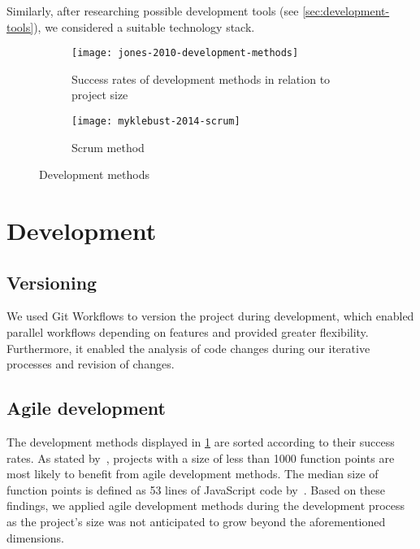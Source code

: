 Similarly, after researching possible development tools (see \cref{sec:development-tools}), we considered a suitable technology stack.

\begin{figure}[H]
    \begin{subfigure}[b]{\textwidth}
        \centering
        \texttt{[image: jones-2010-development-methods]}
        \caption[Success rates of development methods]{Success rates of development methods in relation to project size~\autocite[11]{jones_software_2010}}
        \label{fig:success-rates-development-methods}
    \end{subfigure}
    \begin{subfigure}[b]{\textwidth}
        \centering
        \texttt{[image: myklebust-2014-scrum]}
        \caption[Scrum method]{Scrum method~\autocite[2]{myklebust_scrum_nodate}}
        \label{fig:scrum-method}
    \end{subfigure}
    \caption{Development methods}\label{fig:development-methods}
\end{figure}

\section{Development}\label{sec:development}

\subsection{Versioning}\label{subsec:versioning}

We used Git Workflows to version the project during development, which enabled parallel workflows depending on features and provided greater flexibility.
Furthermore, it enabled the analysis of code changes during our iterative processes and revision of changes.

\subsection{Agile development}\label{subsec:agile-development}

The development methods displayed in \cref{fig:success-rates-development-methods} are sorted according to their success rates.
As stated by~\textcite[10-12]{jones_software_2010}, projects with a size of less than 1000 function points are most likely to benefit from agile development methods.
The median size of function points is defined as 53 lines of JavaScript code by~\textcite{qsm_function_2009}.
Based on these findings, we applied agile development methods during the development process as the project's size was not anticipated to grow beyond the aforementioned dimensions.

